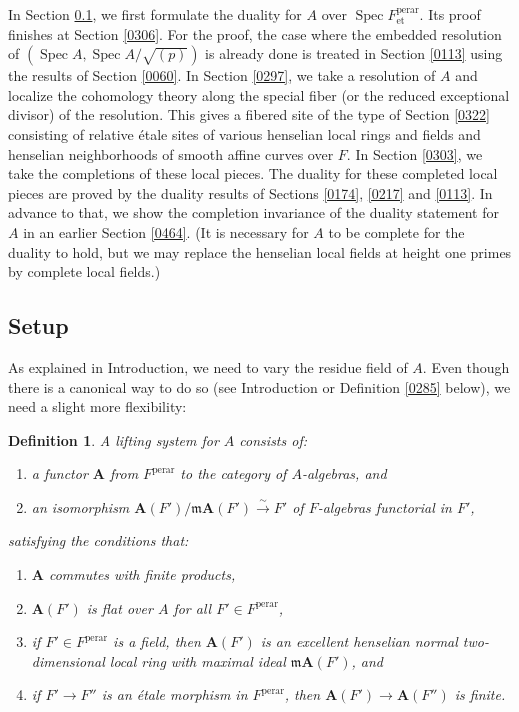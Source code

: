 \documentclass{amsart}
\newtheorem{Def}[Thm]{Definition}
\theoremstyle{remark}
\numberwithin{equation}{subsection}
\newcommand{\isomto}{\overset{\sim}{\to}}
\newcommand{\et}{\mathrm{et}}
\newcommand{\perar}{\mathrm{perar}}
\newcommand{\alg}[1]{\mathbf{#1}}
\newcommand{\ideal}[1]{\mathfrak{#1}}
\DeclareMathOperator{\Spec}{Spec}
\begin{document}
In Section \ref{0278}, we first formulate the duality for $A$ over $\Spec F^{\perar}_{\et}$.
Its proof finishes at Section \ref{0306}.
For the proof, the case where the embedded resolution of $(\Spec A, \Spec A / \sqrt{(p)})$ is already done
is treated in Section \ref{0113}
using the results of Section \ref{0060}.
In Section \ref{0297},
we take a resolution of $A$ and localize the cohomology theory
along the special fiber (or the reduced exceptional divisor) of the resolution.
This gives a fibered site of the type of Section \ref{0322}
consisting of relative \'etale sites of various henselian local rings and fields
and henselian neighborhoods of smooth affine curves over $F$.
In Section \ref{0303},
we take the completions of these local pieces.
The duality for these completed local pieces are proved
by the duality results of Sections \ref{0174}, \ref{0217} and \ref{0113}.
In advance to that, we show the completion invariance
of the duality statement for $A$ in an earlier Section \ref{0464}.
(It is necessary for $A$ to be complete for the duality to hold,
but we may replace the henselian local fields at height one primes
by complete local fields.)


\subsection{Setup}
\label{0278}

As explained in Introduction, we need to vary the residue field of $A$.
Even though there is a canonical way to do so (see Introduction or Definition \ref{0285} below),
we need a slight more flexibility:

\begin{Def} \label{0279}
	A \emph{lifting system} for $A$ consists of:
	\begin{enumerate}
		\item \label{0280}
			a functor $\alg{A}$ from $F^{\perar}$ to the category of $A$-algebras, and
		\item \label{0281}
			an isomorphism $\alg{A}(F') / \ideal{m} \alg{A}(F') \isomto F'$
			of $F$-algebras functorial in $F'$,
	\end{enumerate}
	satisfying the conditions that:
	\begin{enumerate}
		\item \label{0282}
			$\alg{A}$ commutes with finite products,
		\item \label{0283}
			$\alg{A}(F')$ is flat over $A$ for all $F' \in F^{\perar}$,
		\item \label{0284}
			if $F' \in F^{\perar}$ is a field,
			then $\alg{A}(F')$ is an excellent henselian normal two-dimensional local ring
			with maximal ideal $\ideal{m} \alg{A}(F')$, and
		\item \label{0490}
			if $F' \to F''$ is an \'etale morphism in $F^{\perar}$,
			then $\alg{A}(F') \to \alg{A}(F'')$ is finite.
	\end{enumerate}
\end{Def}
\end{document}
